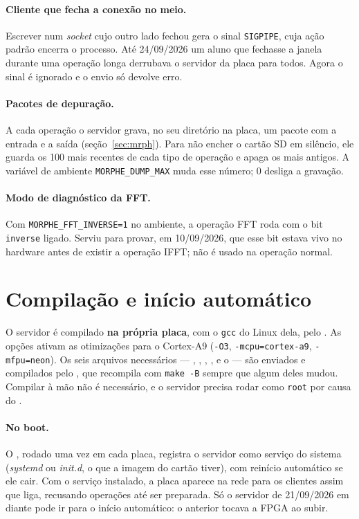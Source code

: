 \paragraph{Cliente que fecha a conexão no meio.} Escrever num \emph{socket} cujo
outro lado fechou gera o sinal \texttt{SIGPIPE}, cuja ação padrão encerra o
processo. Até 24/09/2026 um aluno que fechasse a janela durante uma operação
longa derrubava o servidor da placa para todos. Agora o sinal é ignorado e o
envio só devolve erro.

\paragraph{Pacotes de depuração.} A cada operação o servidor grava, no seu
diretório na placa, um pacote  com a entrada e a saída
(seção~\ref{sec:mrph}). Para não encher o cartão SD em silêncio, ele guarda os
100 mais recentes de cada tipo de operação e apaga os mais antigos. A variável
de ambiente \texttt{MORPHE\_DUMP\_MAX} muda esse número; 0 desliga a gravação.

\paragraph{Modo de diagnóstico da FFT.} Com \texttt{MORPHE\_FFT\_INVERSE=1} no
ambiente, a operação FFT roda com o bit \texttt{inverse} ligado. Serviu para
provar, em 10/09/2026, que esse bit estava vivo no hardware antes de existir a
operação IFFT; não é usado na operação normal.

\section{Compilação e início automático}

O servidor é compilado \textbf{na própria placa}, com o \texttt{gcc} do Linux
dela, pelo . As opções ativam as otimizações para o
Cortex-A9 (\texttt{-O3}, \texttt{-mcpu=cortex-a9}, \texttt{-mfpu=neon}). Os seis
arquivos necessários --- , ,
, ,  e o
 --- são enviados e compilados pelo , que
recompila com \texttt{make -B} sempre que algum deles mudou. Compilar à mão não
é necessário, e o servidor precisa rodar como \texttt{root} por causa do
.

\paragraph{No boot.} O , rodado uma vez
em cada placa, registra o servidor como serviço do sistema (\emph{systemd} ou
\emph{init.d}, o que a imagem do cartão tiver), com reinício automático se ele
cair. Com o serviço instalado, a placa aparece na rede para os clientes assim
que liga, recusando operações até ser preparada. Só o servidor de 21/09/2026 em
diante pode ir para o início automático: o anterior tocava a FPGA ao subir.

